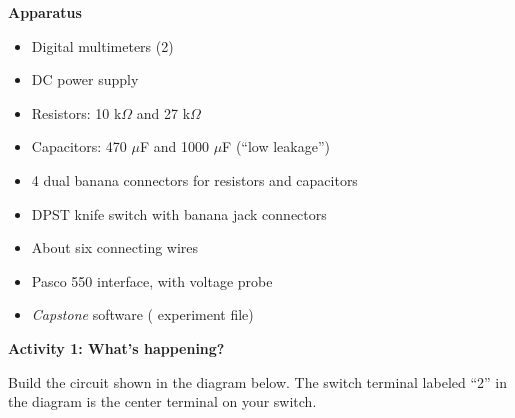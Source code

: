 \makelabheader %

\bigskip
\textbf{Apparatus}

\begin{itemize}[nosep]
\item Digital multimeters (2) 
\item DC power supply 
\item Resistors: 10 k$\Omega$ and 27 k$\Omega$
\item Capacitors: 470 $\mu$F and 1000 $\mu$F (``low leakage'')
\item 4 dual banana connectors for resistors and capacitors
\item DPST knife switch with banana jack connectors
\item About six connecting wires
\item Pasco 550 interface, with voltage probe
\item \textit{Capstone} software ( experiment file)
\end{itemize}

\bigskip
\textbf{Activity 1: What's happening?}

Build the circuit shown in the diagram below.  The switch terminal labeled ``2'' in the diagram is the center terminal on your switch.

